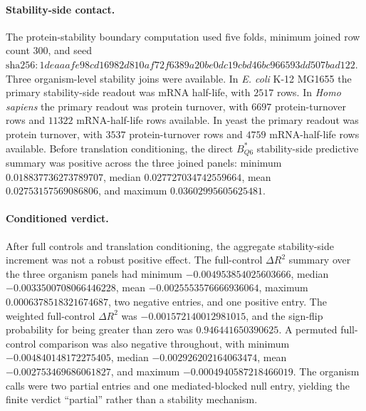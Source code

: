 \paragraph{Stability-side contact.}
The protein-stability boundary computation used five folds, minimum joined row count $300$, and seed $\mathrm{sha256}:1deaaafe98cd16982d810af72f6389a20be0dc19cbd46bc966593dd507bad122$.  Three organism-level stability joins were available.  In \emph{E. coli} K-12 MG1655 the primary stability-side readout was mRNA half-life, with $2517$ rows.  In \emph{Homo sapiens} the primary readout was protein turnover, with $6697$ protein-turnover rows and $11322$ mRNA-half-life rows available.  In yeast the primary readout was protein turnover, with $3537$ protein-turnover rows and $4759$ mRNA-half-life rows available.  Before translation conditioning, the direct $B^{*}_{Q6}$ stability-side predictive summary was positive across the three joined panels: minimum $0.018837736273789707$, median $0.027727034742559664$, mean $0.02753157569086806$, and maximum $0.03602995605625481$.

\paragraph{Conditioned verdict.}
After full controls and translation conditioning, the aggregate stability-side increment was not a robust positive effect.  The full-control $\Delta R^2$ summary over the three organism panels had minimum $-0.004953854025603666$, median $-0.0033500708066446228$, mean $-0.0025553576666936064$, maximum $0.0006378518321674687$, two negative entries, and one positive entry.  The weighted full-control $\Delta R^2$ was $-0.001572140012981015$, and the sign-flip probability for being greater than zero was $0.946441650390625$.  A permuted full-control comparison was also negative throughout, with minimum $-0.004840148172275405$, median $-0.002926202164063474$, mean $-0.002753469686061827$, and maximum $-0.0004940587218466019$.  The organism calls were two partial entries and one mediated-blocked null entry, yielding the finite verdict ``partial'' rather than a stability mechanism.

